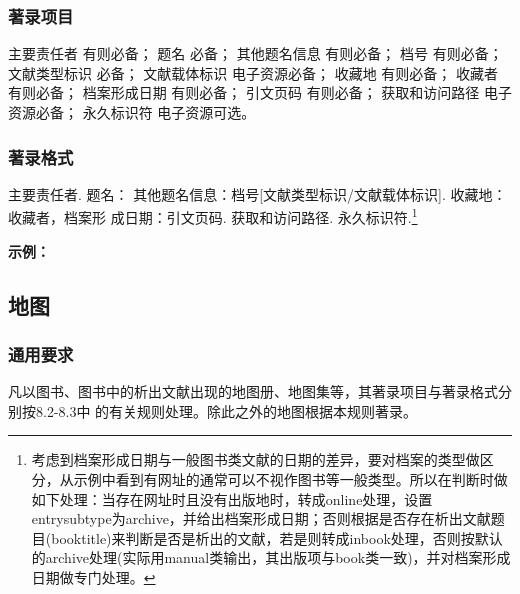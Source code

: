 \documentclass{article}
\begin{document}
\subsubsection{著录项目}

主要责任者 有则必备；
题名 必备；
其他题名信息 有则必备；
档号 有则必备；
文献类型标识 必备；
文献载体标识 电子资源必备；
收藏地 有则必备；
收藏者 有则必备；
档案形成日期 有则必备；
引文页码 有则必备；
获取和访问路径 电子资源必备；
永久标识符 电子资源可选。

\subsubsection{著录格式}

主要责任者. 题名： 其他题名信息：档号[文献类型标识/文献载体标识]. 收藏地： 收藏者，档案形
成日期：引文页码. 获取和访问路径. 永久标识符.\footnote{考虑到档案形成日期与一般图书类文献的日期的差异，要对档案的类型做区分，从示例中看到有网址的通常可以不视作图书等一般类型。所以在判断时做如下处理：当存在网址时且没有出版地时，转成online处理，设置entrysubtype为archive，并给出档案形成日期；否则根据是否存在析出文献题目(booktitle)来判断是否是析出的文献，若是则转成inbook处理，否则按默认的archive处理(实际用manual类输出，其出版项与book类一致)，并对档案形成日期做专门处理。}



\begin{refsection}
\nocite{李鸿章1887,湖北省建设厅1931,武汉市军事管制委员会1949,FITZWILLIAM1570,
中国第一历史档案馆2001--,清代奏折汇编2005,私立武昌2021}


\textbf{示例：}

{\printbibliography[heading=none,env=indentegenv]}

\end{refsection}


\subsection{地图}

\subsubsection{通用要求}

凡以图书、图书中的析出文献出现的地图册、地图集等，其著录项目与著录格式分别按8.2-8.3中
的有关规则处理。除此之外的地图根据本规则著录。
\end{document}
